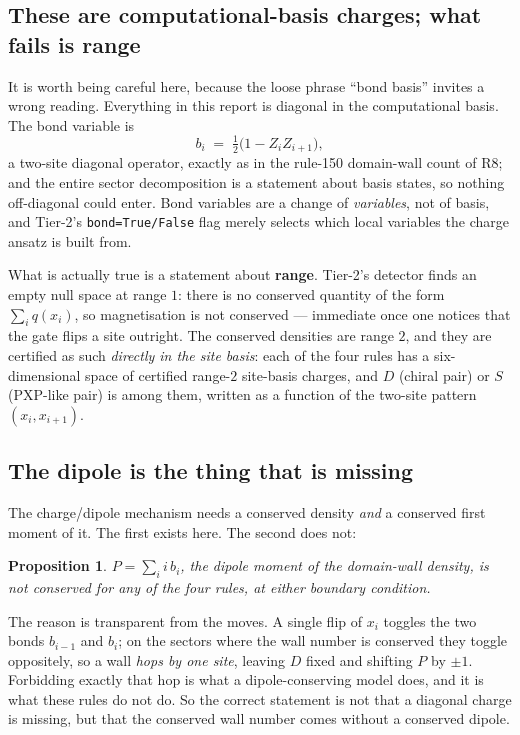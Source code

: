 \documentclass[11pt]{article}
\newcommand{\fn}[1]{\texttt{#1}}
\theoremstyle{plain}
\newtheorem{proposition}{Proposition}
\begin{document}
\subsection{These are computational-basis charges; what fails is range}

It is worth being careful here, because the loose phrase ``bond basis'' invites
a wrong reading. Everything in this report is diagonal in the computational
basis. The bond variable is
\[
b_i \;=\; \tfrac{1}{2}\bigl(1 - Z_i Z_{i+1}\bigr),
\]
a two-site diagonal operator, exactly as in the rule-150 domain-wall count of
R8; and the entire sector decomposition is a statement about basis states, so
nothing off-diagonal could enter. Bond variables are a change of \emph{variables},
not of basis, and Tier-2's \fn{bond=True/False} flag merely selects which local
variables the charge ansatz is built from.

What is actually true is a statement about \textbf{range}. Tier-2's detector
finds an empty null space at range $1$: there is no conserved quantity of the
form $\sum_i q(x_i)$, so magnetisation is not conserved --- immediate once one
notices that the gate flips a site outright. The conserved densities are range
$2$, and they are certified as such \emph{directly in the site basis}: each of
the four rules has a six-dimensional space of certified range-$2$ site-basis
charges, and $D$ (chiral pair) or $S$ (PXP-like pair) is among them, written as
a function of the two-site pattern $(x_i, x_{i+1})$.

\subsection{The dipole is the thing that is missing}

The charge/dipole mechanism needs a conserved density \emph{and} a conserved
first moment of it. The first exists here. The second does not:

\begin{proposition}
$P=\sum_i i\,b_i$, the dipole moment of the domain-wall density, is not
conserved for any of the four rules, at either boundary condition.
\end{proposition}

\noindent The reason is transparent from the moves. A single flip of $x_i$
toggles the two bonds $b_{i-1}$ and $b_i$; on the sectors where the wall number
is conserved they toggle oppositely, so a wall \emph{hops by one site}, leaving
$D$ fixed and shifting $P$ by $\pm1$. Forbidding exactly that hop is what a
dipole-conserving model does, and it is what these rules do not do. So the
correct statement is not that a diagonal charge is missing, but that the
conserved wall number comes without a conserved dipole.
\end{document}
